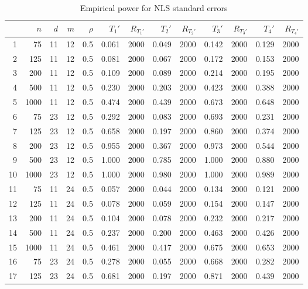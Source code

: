 \documentclass{article}
\begin{document}
\begin{table}[ht]
\begin{center}
\caption{Empirical power for NLS standard errors}
\label{tab:powernls}
\begin{tabular}{rrrrrrrrrrrrr}
  \hline
 & $n$ & $d$ & $m$ & $\rho$ & $T_1'$ & $R_{T_1'}$ & $T_2'$ & $R_{T_2'}$ & $T_3'$ & $R_{T_3'}$ & $T_4'$ & $R_{T_4'}$ \\ 
  \hline
1 & 75 & 11 & 12 & 0.5 & 0.061 & 2000 & 0.049 & 2000 & 0.142 & 2000 & 0.129 & 2000 \\ 
  2 & 125 & 11 & 12 & 0.5 & 0.081 & 2000 & 0.067 & 2000 & 0.172 & 2000 & 0.153 & 2000 \\ 
  3 & 200 & 11 & 12 & 0.5 & 0.109 & 2000 & 0.089 & 2000 & 0.214 & 2000 & 0.195 & 2000 \\ 
  4 & 500 & 11 & 12 & 0.5 & 0.230 & 2000 & 0.203 & 2000 & 0.423 & 2000 & 0.388 & 2000 \\ 
  5 & 1000 & 11 & 12 & 0.5 & 0.474 & 2000 & 0.439 & 2000 & 0.673 & 2000 & 0.648 & 2000 \\ 
   \hline
6 & 75 & 23 & 12 & 0.5 & 0.292 & 2000 & 0.083 & 2000 & 0.693 & 2000 & 0.231 & 2000 \\ 
  7 & 125 & 23 & 12 & 0.5 & 0.658 & 2000 & 0.197 & 2000 & 0.860 & 2000 & 0.374 & 2000 \\ 
  8 & 200 & 23 & 12 & 0.5 & 0.955 & 2000 & 0.367 & 2000 & 0.973 & 2000 & 0.544 & 2000 \\ 
  9 & 500 & 23 & 12 & 0.5 & 1.000 & 2000 & 0.785 & 2000 & 1.000 & 2000 & 0.880 & 2000 \\ 
  10 & 1000 & 23 & 12 & 0.5 & 1.000 & 2000 & 0.980 & 2000 & 1.000 & 2000 & 0.989 & 2000 \\ 
   \hline
11 & 75 & 11 & 24 & 0.5 & 0.057 & 2000 & 0.044 & 2000 & 0.134 & 2000 & 0.121 & 2000 \\ 
  12 & 125 & 11 & 24 & 0.5 & 0.078 & 2000 & 0.059 & 2000 & 0.154 & 2000 & 0.147 & 2000 \\ 
  13 & 200 & 11 & 24 & 0.5 & 0.104 & 2000 & 0.078 & 2000 & 0.232 & 2000 & 0.217 & 2000 \\ 
  14 & 500 & 11 & 24 & 0.5 & 0.237 & 2000 & 0.200 & 2000 & 0.463 & 2000 & 0.426 & 2000 \\ 
  15 & 1000 & 11 & 24 & 0.5 & 0.461 & 2000 & 0.417 & 2000 & 0.675 & 2000 & 0.653 & 2000 \\ 
   \hline
16 & 75 & 23 & 24 & 0.5 & 0.278 & 2000 & 0.055 & 2000 & 0.668 & 2000 & 0.282 & 2000 \\ 
  17 & 125 & 23 & 24 & 0.5 & 0.681 & 2000 & 0.197 & 2000 & 0.871 & 2000 & 0.439 & 2000 \\ 

\end{tabular}
\end{center}
\end{table}
\end{document}
